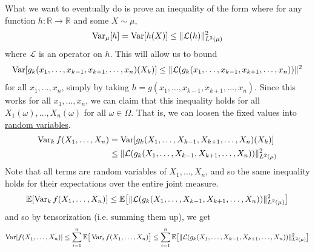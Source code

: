   What we want to eventually do is prove an inequality of the form where for any function $h: \mathbb{R} \rightarrow \mathbb{R}$ and some $X \sim \mu$, 
  \begin{equation}
    \operatorname{Var}_\mu[h] = \operatorname{Var} [h(X)] \leq \|\mathcal{L}(h)\|^2_{L^2 (\mu)}
  \end{equation}
  where $\mathcal{L}$ is an operator on $h$. This will allow us to bound 
  \begin{equation}
    \operatorname{Var} [g_k (x_1, \ldots, x_{k-1}, x_{k+1}, \ldots, x_n)(X_k)] \leq \|\mathcal{L}(g_k (x_1, \ldots, x_{k-1}, x_{k+1}, \ldots, x_n))\|^2
  \end{equation}
  for all $x_1, \ldots, x_n$, simply by taking $h = g(x_1, \ldots, x_{k-1}, x_{k+1}, \ldots, x_n)$. Since this works for all $x_1, \ldots, x_n$, we can claim that this inequality holds for all $X_1 (\omega), \ldots, X_n (\omega)$ for all $\omega \in \Omega$. That is, we can loosen the fixed values into \hyperref[prob-def:random-variable]{random variables}. 
  \begin{align*}
      \operatorname{Var}_{k} f(X_1, \ldots, X_n) & = \operatorname{Var}[g_k (X_1, \ldots, X_{k-1}, X_{k+1}, \ldots, X_n)(X_k)] \\
      & \leq \| \mathcal{L}(g_k (X_1, \ldots, X_{k-1}, X_{k+1}, \ldots, X_n))\|^2_{L^2 (\mu)} 
  \end{align*}
  Note that all terms are random variables of $X_1, \ldots, X_n$, and so the same inequality holds for their expectations over the entire joint measure. 
  \begin{equation}
    \mathbb{E}[ \operatorname{Var}_{k} f(X_1, \ldots, X_n) ] \leq \mathbb{E} \big[ \| \mathcal{L}(g_k (X_1, \ldots, X_{k-1}, X_{k+1}, \ldots, X_n))\|^2_{L^2 (\mu)} \big]
  \end{equation}
  and so by tensorization (i.e. summing them up), we get 
  \begin{equation}
    \operatorname{Var}[f(X_1, \ldots, X_n)] \leq \sum_{i=1}^n \mathbb{E} \big[ \operatorname{Var}_i f(X_1, \ldots, X_n) \big] \leq \sum_{i=1}^n \mathbb{E} \big[ \| \mathcal{L}(g_k (X_1, \ldots, X_{k-1}, X_{k+1}, \ldots, X_n))\|^2_{L^2 (\mu)} \big]
  \end{equation}

